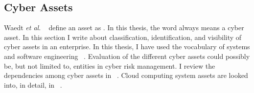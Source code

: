 \subsection{Cyber Assets}\label{sec:assets_cyber}
Waedt \textit{et al}. ~\cite{7580812} define an asset as . In this thesis, the word  always means a cyber asset. In this section I write about classification, identification, and visibility of cyber assets in an enterprise. In this thesis, I have used the vocabulary of systems and software engineering ~\cite{5733835}. Evaluation of the different cyber assets could possibly be, but not limited to, entities in cyber risk management. I review the dependencies among cyber assets in ~\cite{6459865}. Cloud computing system assets are looked into, in detail, in ~\cite{7546222}. \\ 
